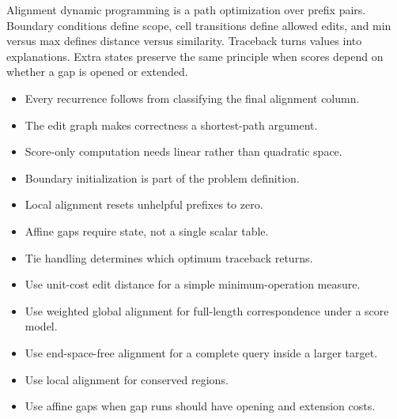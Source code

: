 \documentclass[11pt]{article}
\begin{document}
\begin{tcolorbox}[enhanced,breakable,title={Chapter synthesis},
  colback=Accent!5,colframe=Accent,fonttitle=\small\sffamily\bfseries,fontupper=\footnotesize,
  boxsep=0.6mm,left=1.5mm,right=1.5mm,top=1mm,bottom=1mm,before skip=3pt,after skip=3pt]
Alignment dynamic programming is a path optimization over prefix pairs. Boundary conditions define scope, cell transitions define allowed edits, and min versus max defines distance versus similarity. Traceback turns values into explanations. Extra states preserve the same principle when scores depend on whether a gap is opened or extended.
\end{tcolorbox}

\begin{tcolorbox}[enhanced,breakable,title={Key takeaways},
  colback=white,colframe=Primary,fonttitle=\small\sffamily\bfseries,fontupper=\footnotesize,
  boxsep=0.6mm,left=1.5mm,right=1.5mm,top=1mm,bottom=1mm,before skip=3pt,after skip=3pt]
\begin{itemize}
  \item Every recurrence follows from classifying the final alignment column.
  \item The edit graph makes correctness a shortest-path argument.
  \item Score-only computation needs linear rather than quadratic space.
  \item Boundary initialization is part of the problem definition.
  \item Local alignment resets unhelpful prefixes to zero.
  \item Affine gaps require state, not a single scalar table.
  \item Tie handling determines which optimum traceback returns.
\end{itemize}
\end{tcolorbox}

\begin{tcolorbox}[enhanced,breakable,title={Algorithm selection / when to use this},
  colback=Primary!3,colframe=Primary,fonttitle=\small\sffamily\bfseries,fontupper=\footnotesize,
  boxsep=0.6mm,left=1.5mm,right=1.5mm,top=1mm,bottom=1mm,before skip=3pt,after skip=3pt]
\begin{itemize}
  \item Use unit-cost edit distance for a simple minimum-operation measure.
  \item Use weighted global alignment for full-length correspondence under a score model.
  \item Use end-space-free alignment for a complete query inside a larger target.
  \item Use local alignment for conserved regions.
  \item Use affine gaps when gap runs should have opening and extension costs.
\end{itemize}
\end{tcolorbox}
\end{document}
